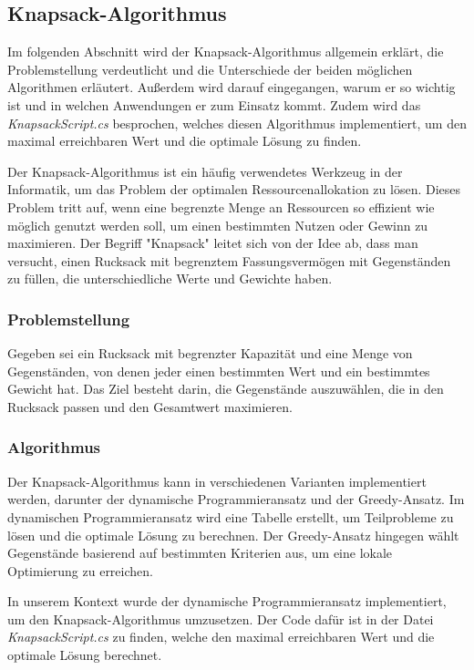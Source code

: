 
\subsection{Knapsack-Algorithmus}
Im folgenden Abschnitt wird der Knapsack-Algorithmus allgemein erklärt, die Problemstellung verdeutlicht und die
Unterschiede der beiden möglichen Algorithmen erläutert. Außerdem wird darauf eingegangen, warum er so wichtig ist
und in welchen Anwendungen er zum Einsatz kommt. Zudem wird das \textit{KnapsackScript.cs} besprochen, welches
diesen Algorithmus implementiert, um den maximal erreichbaren Wert und die optimale Lösung zu finden.

Der Knapsack-Algorithmus ist ein häufig verwendetes Werkzeug in der Informatik, um das Problem der optimalen
Ressourcenallokation zu lösen. Dieses Problem tritt auf, wenn eine begrenzte Menge an Ressourcen so effizient wie
möglich genutzt werden soll, um einen bestimmten Nutzen oder Gewinn zu maximieren. Der Begriff "Knapsack" leitet sich
von der Idee ab, dass man versucht, einen Rucksack mit begrenztem Fassungsvermögen mit Gegenständen zu füllen, die
unterschiedliche Werte und Gewichte haben.

\subsubsection{Problemstellung}
Gegeben sei ein Rucksack mit begrenzter Kapazität und eine Menge von Gegenständen, von denen jeder einen bestimmten
Wert und ein bestimmtes Gewicht hat. Das Ziel besteht darin, die Gegenstände auszuwählen, die in den Rucksack passen
und den Gesamtwert maximieren.

\subsubsection{Algorithmus}
Der Knapsack-Algorithmus kann in verschiedenen Varianten implementiert werden, darunter der dynamische
Programmieransatz und der Greedy-Ansatz. Im dynamischen Programmieransatz wird eine Tabelle erstellt, um
Teilprobleme zu lösen und die optimale Lösung zu berechnen. Der Greedy-Ansatz hingegen wählt Gegenstände basierend
auf bestimmten Kriterien aus, um eine lokale Optimierung zu erreichen.

In unserem Kontext wurde der dynamische Programmieransatz implementiert, um den Knapsack-Algorithmus umzusetzen.
Der Code dafür ist in der Datei \textit{KnapsackScript.cs} zu finden, welche den maximal erreichbaren Wert und
die optimale Lösung berechnet.

